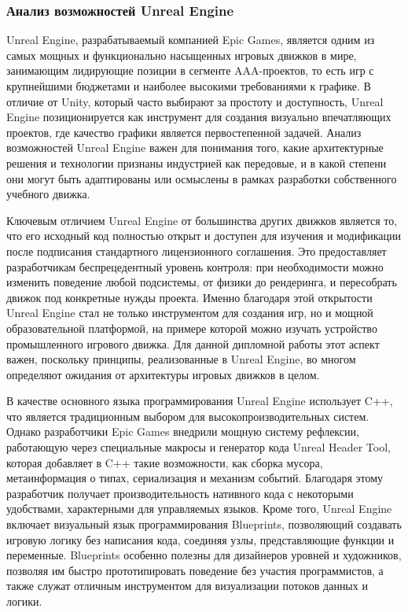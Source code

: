 \subsubsection{Анализ возможностей Unreal Engine}
Unreal Engine, разрабатываемый компанией Epic Games, является одним из самых мощных и функционально насыщенных игровых движков в мире, занимающим лидирующие позиции в сегменте AAA-проектов, то есть игр с крупнейшими бюджетами и наиболее высокими требованиями к графике. В отличие от Unity, который часто выбирают за простоту и доступность, Unreal Engine позиционируется как инструмент для создания визуально впечатляющих проектов, где качество графики является первостепенной задачей. Анализ возможностей Unreal Engine важен для понимания того, какие архитектурные решения и технологии признаны индустрией как передовые, и в какой степени они могут быть адаптированы или осмыслены в рамках разработки собственного учебного движка.

Ключевым отличием Unreal Engine от большинства других движков является то, что его исходный код полностью открыт и доступен для изучения и модификации после подписания стандартного лицензионного соглашения. Это предоставляет разработчикам беспрецедентный уровень контроля: при необходимости можно изменить поведение любой подсистемы, от физики до рендеринга, и пересобрать движок под конкретные нужды проекта. Именно благодаря этой открытости Unreal Engine стал не только инструментом для создания игр, но и мощной образовательной платформой, на примере которой можно изучать устройство промышленного игрового движка. Для данной дипломной работы этот аспект важен, поскольку принципы, реализованные в Unreal Engine, во многом определяют ожидания от архитектуры игровых движков в целом.

В качестве основного языка программирования Unreal Engine использует C++, что является традиционным выбором для высокопроизводительных систем. Однако разработчики Epic Games внедрили мощную систему рефлексии, работающую через специальные макросы и генератор кода Unreal Header Tool, которая добавляет в C++ такие возможности, как сборка мусора, метаинформация о типах, сериализация и механизм событий. Благодаря этому разработчик получает производительность нативного кода с некоторыми удобствами, характерными для управляемых языков. Кроме того, Unreal Engine включает визуальный язык программирования Blueprints, позволяющий создавать игровую логику без написания кода, соединяя узлы, представляющие функции и переменные. Blueprints особенно полезны для дизайнеров уровней и художников, позволяя им быстро прототипировать поведение без участия программистов, а также служат отличным инструментом для визуализации потоков данных и логики.

